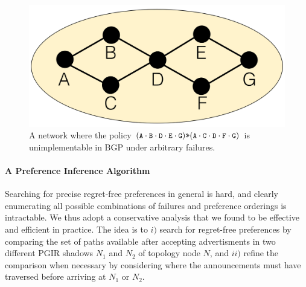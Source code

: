 \documentclass[10pt]{sigalternate052015}
\newcommand{\para}[1]{\paragraph*{\textbf{#1}}}
\newcommand{\CD}[1]{\texttt{\small #1}}  %
\newcommand{\Prefer}{\texttt{>>}}
\begin{document}
\begin{figure}[t!]
  \centering
  \includegraphics[width=.8\columnwidth]{figures/unimplementable}
  \caption{A network where the policy $(\CD{A} \cdot \CD{B} \cdot \CD{D} \cdot \CD{E} \cdot \CD{G}) \Prefer (\CD{A} \cdot \CD{C} \cdot \CD{D} \cdot \CD{F} \cdot \CD{G})$ is unimplementable in BGP under arbitrary failures.}
  \label{fig:unimplementable}
\end{figure}

\para{A Preference Inference Algorithm}


Searching for precise regret-free preferences in general is hard, and clearly enumerating all possible combinations of failures and preference orderings is intractable. We thus adopt a conservative analysis that we found to be effective and efficient in practice. The idea is to $i)$ search for regret-free preferences by comparing the set of paths available after accepting advertisments in two different PGIR shadows $N_1$ and $N_2$ of topology node $N$, and $ii)$ refine the comparison when necessary by considering where the announcements must have traversed before arriving at $N_1$ or $N_2$.
\end{document}
